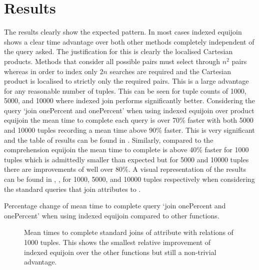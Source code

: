 \section{Results}\label{sec:benchmark:results}
The results clearly show the expected pattern. In most cases indexed equijoin
shows a clear time advantage over both other methods completely independent of
the query asked. The justification for this is clearly the localised Cartesian
products. Methods that consider all possible pairs must select through $n^2$
pairs whereas in order to index only $2n$ searches are required and the
Cartesian product is localised to strictly only the required pairs. This is a
large advantage for any reasonable number of tuples. This can be seen for tuple
counts of 1000, 5000, and 10000 where indexed join performs significantly better.
Considering the query `join onePercent and onePercent' when using indexed
equijoin over product equijoin the mean time to complete each query is over 70\% faster
with both 5000 and 10000 tuples recording a mean time above 90\% faster. This
is very significant and the table of results can be found in
. Similarly, compared to the comprehension
equijoin the mean time to complete is above 40\% faster for 1000 tuples which is
admittedly smaller than expected but for 5000 and 10000 tuples there are
improvements of well over 80\%. A visual representation of the results can be
found in ,
,
 for 1000, 5000, and 10000 tuples
respectively when considering the standard queries that join attributes to
.

\begin{table}[b]
    \centering
    
    \caption{Percentage change of mean time to complete query `join onePercent
        and onePercent' when using indexed equijoin compared to other
    functions.}
    \label{tab:percentage-change-of-means-join-onePercent-and-onePercent}
\end{table}

\begin{figure}[p]
    
    \caption{Mean times to complete standard joins of
     attribute with relations of 1000 tuples. This
shows the smallest relative improvement of indexed equijoin over the other
functions but still a non-trivial advantage.}
    \label{fig:benchmark:onePercent-1000}
\end{figure}

